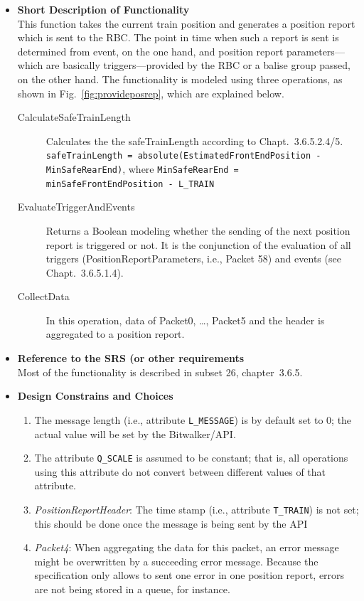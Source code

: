 \begin{itemize}
\item \textbf{Short Description of Functionality}\\
This function takes the current train position and generates a position report which is sent to the RBC. The point in time when such a report is sent is determined from event, on the one hand, and position report parameters---which are basically triggers---provided by the RBC or a balise group passed, on the other hand. The functionality is modeled using three operations, as shown in Fig.~\ref{fig:provideposrep}, which are explained below.
\begin{description}
	\item[CalculateSafeTrainLength] Calculates the the safeTrainLength according to Chapt.~3.6.5.2.4/5.
\verb+safeTrainLength = absolute(EstimatedFrontEndPosition - MinSafeRearEnd)+, where
\verb+MinSafeRearEnd = minSafeFrontEndPosition - L_TRAIN+
	\item[EvaluateTriggerAndEvents] Returns a Boolean modeling whether the sending of the next position report is triggered or not. It is the conjunction of the evaluation of all triggers (PositionReportParameters, i.e., Packet 58) and events (see Chapt.~3.6.5.1.4).
	\item[CollectData] In this operation, data of Packet0, \dots, Packet5 and the header is aggregated to a position report.
\end{description}
\item \textbf{Reference to the SRS (or other requirements}\\
Most of the functionality is described in subset 26, chapter~3.6.5.
\item \textbf{Design Constrains and Choices}\\
\begin{enumerate}
	\item The message length (i.e., attribute \verb+L_MESSAGE+) is by default set to 0; the actual value will be set by the Bitwalker/API.
	\item The attribute \verb+Q_SCALE+ is assumed to be constant; that is, all operations using this attribute do not convert between different values of that attribute.
	\item \textit{PositionReportHeader}: The time stamp (i.e., attribute \verb+T_TRAIN+) is not set; this should be done once the message is being sent by the API
	\item \textit{Packet4}: When aggregating the data for this packet, an error message might be overwritten by a succeeding error message. Because the specification only allows to sent one error in one position report, errors are not being stored in a queue, for instance.

\end{enumerate}
\end{itemize}
